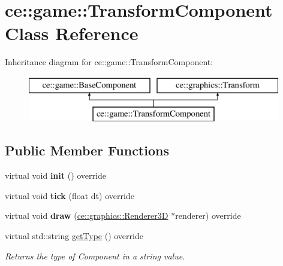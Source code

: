 \hypertarget{classce_1_1game_1_1_transform_component}{}\section{ce\+:\+:game\+:\+:Transform\+Component Class Reference}
\label{classce_1_1game_1_1_transform_component}
Inheritance diagram for ce\+:\+:game\+:\+:Transform\+Component\+:\begin{figure}[H]
\begin{center}
\leavevmode
\includegraphics[height=2.000000cm]{classce_1_1game_1_1_transform_component}
\end{center}
\end{figure}
\subsection*{Public Member Functions}
\begin{DoxyCompactItemize}
\item 
\mbox{\label{classce_1_1game_1_1_transform_component_a43c2bc090897e4581ebf0edf463d7c09}} 
virtual void {\bfseries init} () override
\item 
\mbox{\label{classce_1_1game_1_1_transform_component_afb2efbc69b503a59ebe4e0e6c8fc1b62}} 
virtual void {\bfseries tick} (float dt) override
\item 
\mbox{\label{classce_1_1game_1_1_transform_component_ad73ce4088d1771b2e28b8ce4f0ed9214}} 
virtual void {\bfseries draw} (\hyperlink{classce_1_1graphics_1_1_renderer3_d}{ce\+::graphics\+::\+Renderer3D} $\ast$renderer) override
\item 
virtual std\+::string \hyperlink{classce_1_1game_1_1_transform_component_ae4a2729b3f88a77b8405de317ab03510}{get\+Type} () override
\begin{DoxyCompactList}\small\item\em Returns the type of Component in a string value. \end{DoxyCompactList}\end{DoxyCompactItemize}

